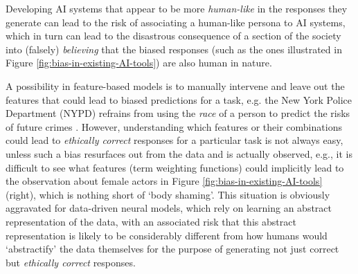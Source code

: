 \documentclass[letterpaper]{article}
\begin{document}
Developing AI systems that appear to be more \emph{human-like} in the responses they generate \citep{Scheutz2007,Cambria:2016} can lead to the risk of
associating a human-like persona to AI systems,
which in turn can lead to the disastrous consequence of a section of the society into (falsely) \emph{believing} that the biased responses (such as the ones illustrated in Figure \ref{fig:bias-in-existing-AI-tools}) are also human in nature.

A possibility in feature-based models is to manually intervene and leave out the features that could lead to biased predictions for a task, e.g. the New York Police Department (NYPD) refrains from using the \emph{race} of a person to predict the risks of future crimes \citep{ProPublica}. However, understanding which features or their combinations could lead to \emph{ethically correct} responses for a particular task is not always easy, unless such a bias resurfaces out from the data and is actually observed, e.g., it is difficult to see what features (term weighting functions) could implicitly lead to the observation about female actors in Figure \ref{fig:bias-in-existing-AI-tools} (right), which is nothing short of `body shaming'. This situation is obviously aggravated for data-driven neural models, which rely on learning an abstract representation of the data, with an associated risk that this abstract representation is likely to be considerably different from how humans would `abstractify' the data themselves for the purpose of generating not just correct but \emph{ethically correct} responses.

\end{document}
